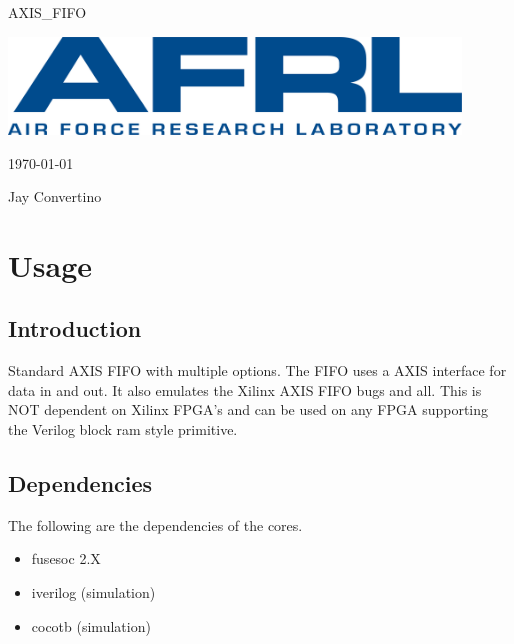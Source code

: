 \begin{titlepage}
  \begin{center}

  {\Huge AXIS\_FIFO}

  \vspace{25mm}

  \includegraphics[width=0.90\textwidth,height=\textheight,keepaspectratio]{img/AFRL.png}

  \vspace{25mm}

  \today

  \vspace{15mm}

  {\Large Jay Convertino}

  \end{center}
\end{titlepage}

\tableofcontents

\newpage

\section{Usage}

\subsection{Introduction}

\par
Standard AXIS FIFO with multiple options. The FIFO uses a AXIS interface for data in and out.
It also emulates the Xilinx AXIS FIFO bugs and all. This is NOT dependent on Xilinx FPGA's and
can be used on any FPGA supporting the Verilog block ram style primitive.

\subsection{Dependencies}

\par
The following are the dependencies of the cores.

\begin{itemize}
  \item fusesoc 2.X
  \item iverilog (simulation)
  \item cocotb (simulation)
\end{itemize}

